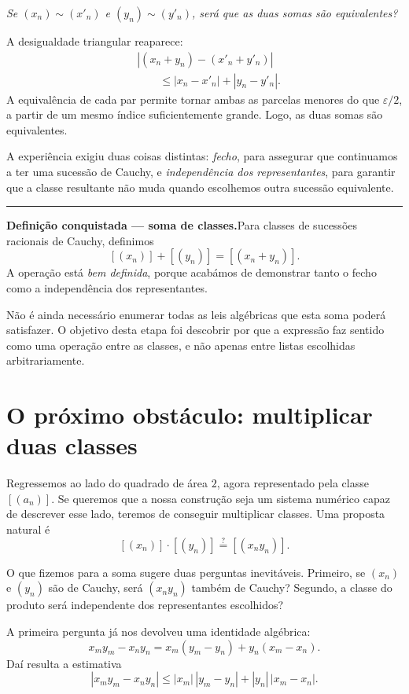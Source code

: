\documentclass[11pt,a4paper]{article}
\newcommand{\questao}[1]{\par\medskip\noindent\textit{#1}\par\smallskip}
\newcommand{\assentado}[2]{%
\par\medskip\noindent\begingroup\color{azul}\rule{\linewidth}{0.45pt}\par\smallskip
\noindent\textbf{#1.}\enspace #2\par\endgroup\medskip}
\begin{document}
\questao{Se $(x_n)\sim(x'_n)$ e $(y_n)\sim(y'_n)$, será que as duas somas são equivalentes?}

A desigualdade triangular reaparece:
\[
 \begin{aligned}
 &|(x_n+y_n)-(x'_n+y'_n)|\\
 &\hspace{2em}\le |x_n-x'_n|+|y_n-y'_n|.
 \end{aligned}
\]
A equivalência de cada par permite tornar ambas as parcelas menores do que $\varepsilon/2$, a partir de um mesmo índice suficientemente grande. Logo, as duas somas são equivalentes.

A experiência exigiu duas coisas distintas: \emph{fecho}, para assegurar que continuamos a ter uma sucessão de Cauchy, e \emph{independência dos representantes}, para garantir que a classe resultante não muda quando escolhemos outra sucessão equivalente.

\assentado{Definição conquistada --- soma de classes}{Para classes de sucessões racionais de Cauchy, definimos
\[
 \boxed{[(x_n)]+[(y_n)]=[(x_n+y_n)].}
\]
A operação está \emph{bem definida}, porque acabámos de demonstrar tanto o fecho como a independência dos representantes.}

Não é ainda necessário enumerar todas as leis algébricas que esta soma poderá satisfazer. O objetivo desta etapa foi descobrir por que a expressão faz sentido como uma operação entre as classes, e não apenas entre listas escolhidas arbitrariamente.

\section{O próximo obstáculo: multiplicar duas classes}

Regressemos ao lado do quadrado de área $2$, agora representado pela classe $[(a_n)]$. Se queremos que a nossa construção seja um sistema numérico capaz de descrever esse lado, teremos de conseguir multiplicar classes. Uma proposta natural é
\[
 [(x_n)]\cdot[(y_n)]\overset{?}{=}[(x_ny_n)].
\]

O que fizemos para a soma sugere duas perguntas inevitáveis. Primeiro, se $(x_n)$ e $(y_n)$ são de Cauchy, será $(x_ny_n)$ também de Cauchy? Segundo, a classe do produto será independente dos representantes escolhidos?

A primeira pergunta já nos devolveu uma identidade algébrica:
\[
 x_my_m-x_ny_n
 =x_m(y_m-y_n)+y_n(x_m-x_n).
\]
Daí resulta a estimativa
\[
 |x_my_m-x_ny_n|
 \le |x_m|\,|y_m-y_n|+|y_n|\,|x_m-x_n|.
\]
\end{document}
